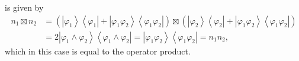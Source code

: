 \documentclass[aps,preprint]{revtex4}%
\begin{document}
is given by
\begin{align}
n_{1}\boxtimes n_{2}  & =\left(  \left\vert \varphi_{1}\right\rangle
\left\langle \varphi_{1}\right\vert +\left\vert \varphi_{1}\varphi
_{2}\right\rangle \left\langle \varphi_{1}\varphi_{2}\right\vert \right)
\boxtimes\left(  \left\vert \varphi_{2}\right\rangle \left\langle \varphi
_{2}\right\vert +\left\vert \varphi_{1}\varphi_{2}\right\rangle \left\langle
\varphi_{1}\varphi_{2}\right\vert \right)  \\
& =2\left\vert \varphi_{1}\wedge\varphi_{2}\right\rangle \left\langle
\varphi_{1}\wedge\varphi_{2}\right\vert =\left\vert \varphi_{1}\varphi
_{2}\right\rangle \left\langle \varphi_{1}\varphi_{2}\right\vert =n_{1}n_{2},
\end{align}
which in this case is equal to the operator product. 
\end{document}
